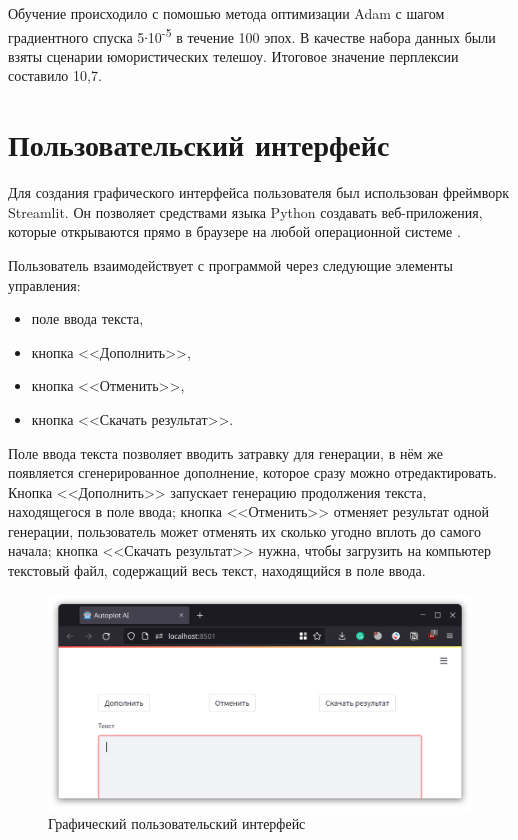 Обучение происходило с помошью метода оптимизации Adam с шагом градиентного спуска 5∙10\textsuperscript{-5} в течение 100 эпох. В качестве набора данных были взяты сценарии юмористических телешоу. Итоговое значение перплексии составило 10,7.

\section{Пользовательский интерфейс}

Для создания графического интерфейса пользователя был использован фреймворк Streamlit. Он позволяет средствами языка Python создавать веб-приложения, которые открываются прямо в браузере на любой операционной системе \cite{doc:streamlit}.

Пользователь взаимодействует с программой через следующие элементы управления:
\begin{itemize}
    \item поле ввода текста,
    \item кнопка <<Дополнить>>,
    \item кнопка <<Отменить>>,
    \item кнопка <<Скачать результат>>.
\end{itemize}

Поле ввода текста позволяет вводить затравку для генерации, в нём же появляется сгенерированное дополнение, которое сразу можно отредактировать. Кнопка <<Дополнить>> запускает генерацию продолжения текста, находящегося в поле ввода; кнопка <<Отменить>> отменяет результат одной генерации, пользователь может отменять их сколько угодно вплоть до самого начала; кнопка <<Скачать результат>> нужна, чтобы загрузить на компьютер текстовый файл, содержащий весь текст, находящийся в поле ввода.

\begin{figure}
    \centering
    \includegraphics[width=\textwidth]{../inc/images/gui.png}
    \caption{Графический пользовательский интерфейс}
    \label{fig:gui}
\end{figure}

